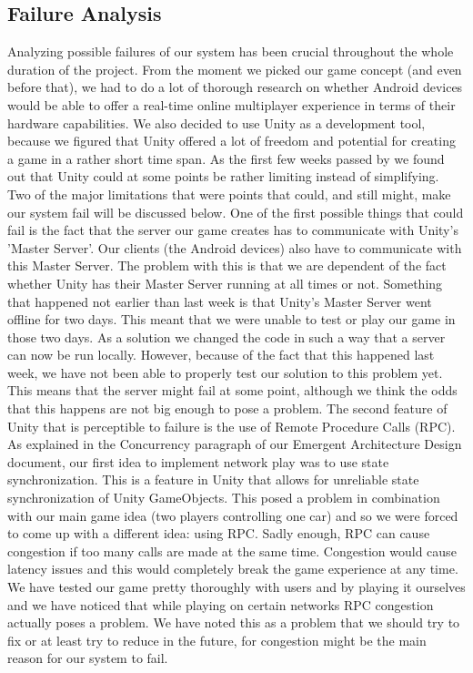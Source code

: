 \documentclass[11pt,twoside,a4paper]{article}
\begin{document}
\subsection{Failure Analysis}
Analyzing possible failures of our system has been crucial throughout the whole duration of the project. From the moment we picked our game concept (and even before that), we had to do a lot of thorough research on whether Android devices would be able to offer a real-time online multiplayer experience in terms of their hardware capabilities.\newline
We also decided to use Unity as a development tool, because we figured that Unity offered a lot of freedom and potential for creating a game in a rather short time span. As the first few weeks passed by we found out that Unity could at some points be rather limiting instead of simplifying. Two of the major limitations that were points that could, and still might, make our system fail will be discussed below.
\newline
\newline
One of the first possible things that could fail is the fact that the server our game creates has to communicate with Unity's 'Master Server'. Our clients (the Android devices) also have to communicate with this Master Server. The problem with this is that we are dependent of the fact whether Unity has their Master Server running at all times or not. Something that happened not earlier than last week is that Unity's Master Server went offline for two days. This meant that we were unable to test or play our game in those two days. As a solution we changed the code in such a way that a server can now be run locally. However, because of the fact that this happened last week, we have not been able to properly test our solution to this problem yet. This means that the server might fail at some point, although we think the odds that this happens are not big enough to pose a problem.
\newline
\newline
The second feature of Unity that is perceptible to failure is the use of Remote Procedure Calls (RPC). As explained in the Concurrency paragraph of our Emergent Architecture Design document, our first idea to implement network play was to use state synchronization. This is a feature in Unity that allows for unreliable state synchronization of Unity GameObjects. This posed a problem in combination with our main game idea (two players controlling one car) and so we were forced to come up with a different idea: using RPC. Sadly enough, RPC can cause congestion if too many calls are made at the same time. Congestion would cause latency issues and this would completely break the game experience at any time. We have tested our game pretty thoroughly with users and by playing it ourselves and we have noticed that while playing on certain networks RPC congestion actually poses a problem. We have noted this as a problem that we should try to fix or at least try to reduce in the future, for congestion might be the main reason for our system to fail.
\end{document}
